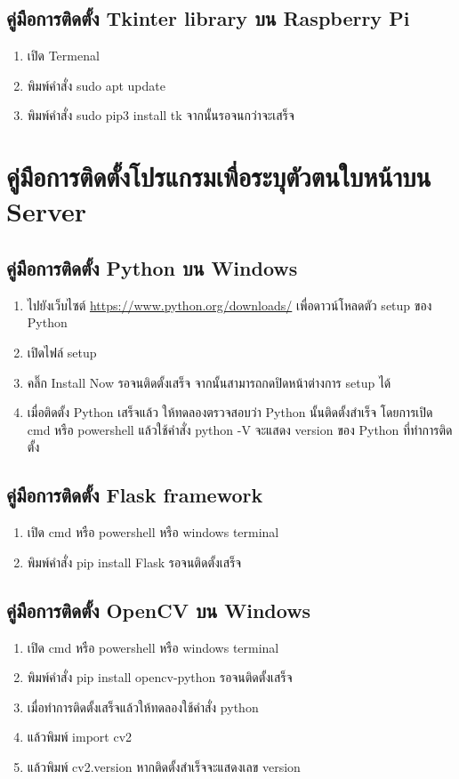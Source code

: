 \subsection{คู่มือการติดตั้ง Tkinter library บน Raspberry Pi}
\begin{enumerate}
  \item เปิด Termenal
  \item พิมพ์คำสั่ง sudo apt update
  \item พิมพ์คำสั่ง sudo pip3 install tk จากนั้นรอจนกว่าจะเสร็จ
\end{enumerate}


\section{คู่มือการติดตั้งโปรแกรมเพื่อระบุตัวตนใบหน้าบน Server}
\subsection{คู่มือการติดตั้ง Python บน Windows}
\begin{enumerate}
  \item ไปยังเว็บไซต์ \url{https://www.python.org/downloads/} เพื่อดาวน์โหลดตัว setup ของ Python
  \item เปิดไฟล์ setup
  \item คลิ๊ก Install Now รอจนติดตั้งเสร็จ จากนั้นสามารถกดปิดหน้าต่างการ setup ได้
  \item เมื่อติดตั้ง Python เสร็จแล้ว ให้ทดลองตรวจสอบว่า Python นั้นติดตั้งสําเร็จ โดยการเปิด cmd
  หรือ powershell แล้วใช้คําสั่ง python -V จะแสดง version ของ Python ที่ทําการติดตั้ง
\end{enumerate}

\subsection{คู่มือการติดตั้ง Flask framework}
\begin{enumerate}
  \item เปิด cmd หรือ powershell หรือ windows terminal
  \item พิมพ์คำสั่ง pip install Flask รอจนติดตั้งเสร็จ
\end{enumerate}

\subsection{คู่มือการติดตั้ง OpenCV บน Windows}
\begin{enumerate}
  \item เปิด cmd หรือ powershell หรือ windows terminal
  \item พิมพ์คำสั่ง pip install opencv-python รอจนติดตั้งเสร็จ
  \item เมื่อทำการติดตั้งเสร็จแล้วให้ทดลองใช้คำสั่ง python
  \item แล้วพิมพ์ import cv2
  \item แล้วพิมพ์ cv2.\textunderscore\textunderscore version \textunderscore\textunderscore หากติดตั้งสำเร็จจะแสดงเลข version
\end{enumerate}

